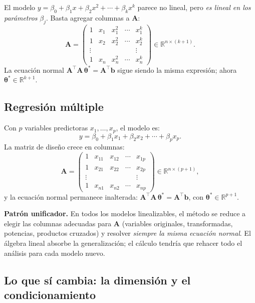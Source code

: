 \documentclass[12pt, a4paper]{article}
\newenvironment{vizdef}{%
    \begin{mdframed}[style=vizazul]
}{%
    \end{mdframed}
}
\newcommand{\R}{\mathbb{R}}
\newcommand{\T}{{\top}}
\newcommand{\btheta}{\boldsymbol{\theta}}
\begin{document}
El modelo $y = \beta_0 + \beta_1 x + \beta_2 x^2 + \cdots + \beta_k x^k$
parece no lineal, pero \emph{es lineal en los parámetros} $\beta_j$.
Basta agregar columnas a $\mathbf{A}$:
\[
    \mathbf{A} = \begin{pmatrix}
        1 & x_1 & x_1^2 & \cdots & x_1^k \\
        1 & x_2 & x_2^2 & \cdots & x_2^k \\
        \vdots & & & & \vdots \\
        1 & x_n & x_n^2 & \cdots & x_n^k
    \end{pmatrix} \in \R^{n \times (k+1)}.
\]
La ecuación normal $\mathbf{A}^\T\mathbf{A}\,\btheta^* = \mathbf{A}^\T\mathbf{b}$
sigue siendo la misma expresión; ahora $\btheta^* \in \R^{k+1}$.

\subsection{Regresión múltiple}

Con $p$ variables predictoras $x_1, \ldots, x_p$, el modelo es:
\[
    y = \beta_0 + \beta_1 x_1 + \beta_2 x_2 + \cdots + \beta_p x_p.
\]
La matriz de diseño crece en columnas:
\[
    \mathbf{A} = \begin{pmatrix}
        1 & x_{11} & x_{12} & \cdots & x_{1p} \\
        1 & x_{21} & x_{22} & \cdots & x_{2p} \\
        \vdots & & & & \vdots \\
        1 & x_{n1} & x_{n2} & \cdots & x_{np}
    \end{pmatrix} \in \R^{n \times (p+1)},
\]
y la ecuación normal permanece inalterada: $\mathbf{A}^\T\mathbf{A}\,\btheta^* = \mathbf{A}^\T\mathbf{b}$,
con $\btheta^* \in \R^{p+1}$.

\begin{vizdef}
\textbf{Patrón unificador.} En todos los modelos linealizables, el método
se reduce a elegir las columnas adecuadas para $\mathbf{A}$ (variables originales,
transformadas, potencias, productos cruzados) y resolver \emph{siempre la
misma ecuación normal}. El álgebra lineal absorbe la generalización; el
cálculo tendría que rehacer todo el análisis para cada modelo nuevo.
\end{vizdef}

\subsection{Lo que sí cambia: la dimensión y el condicionamiento}
\end{document}
